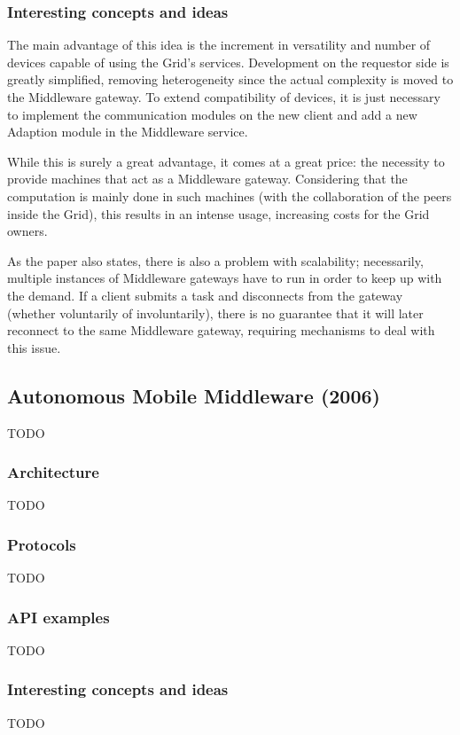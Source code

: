 \subsubsection{Interesting concepts and ideas}
The main advantage of this idea is the increment in versatility and number of devices capable of using the Grid's services. Development on the requestor side is greatly simplified, removing heterogeneity since the actual complexity is moved to the Middleware gateway. To extend compatibility of devices, it is just necessary to implement the communication modules on the new client and add a new Adaption module in the Middleware service.

While this is surely a great advantage, it comes at a great price: the necessity to provide machines that act as a Middleware gateway. Considering that the computation is mainly done in such machines (with the collaboration of the peers inside the Grid), this results in an intense usage, increasing costs for the Grid owners.

As the paper also states, there is also a problem with scalability; necessarily, multiple instances of Middleware gateways have to run in order to keep up with the demand. If a client submits a task and disconnects from the gateway (whether voluntarily of involuntarily), there is no guarantee that it will later reconnect to the same Middleware gateway, requiring mechanisms to deal with this issue.

\subsection{Autonomous Mobile Middleware (2006)}
TODO

\subsubsection{Architecture}
TODO

\subsubsection{Protocols}
TODO

\subsubsection{API examples}
TODO

\subsubsection{Interesting concepts and ideas}
TODO